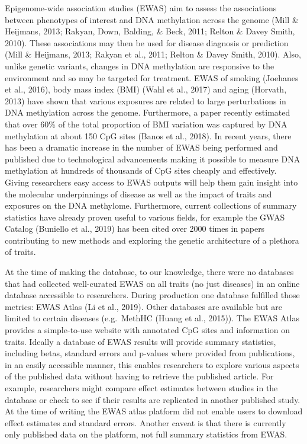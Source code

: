 \documentclass[11pt,twoside]{bristolthesis}
\begin{document}
Epigenome-wide association studies (EWAS) aim to assess the associations between phenotypes of interest and DNA methylation across the genome (Mill \& Heijmans, 2013; Rakyan, Down, Balding, \& Beck, 2011; Relton \& Davey Smith, 2010). These associations may then be used for disease diagnosis or prediction (Mill \& Heijmans, 2013; Rakyan et al., 2011; Relton \& Davey Smith, 2010). Also, unlike genetic variants, changes in DNA methylation are responsive to the environment and so may be targeted for treatment. EWAS of smoking (Joehanes et al., 2016), body mass index (BMI) (Wahl et al., 2017) and aging (Horvath, 2013) have shown that various exposures are related to large perturbations in DNA methylation across the genome. Furthermore, a paper recently estimated that over 60\% of the total proportion of BMI variation was captured by DNA methylation at about 150 CpG sites (Banos et al., 2018). In recent years, there has been a dramatic increase in the number of EWAS being performed and published due to technological advancements making it possible to measure DNA methylation at hundreds of thousands of CpG sites cheaply and effectively. Giving researchers easy access to EWAS outputs will help them gain insight into the molecular underpinnings of disease as well as the impact of traits and exposures on the DNA methylome. Furthermore, current collections of summary statistics have already proven useful to various fields, for example the GWAS Catalog (Buniello et al., 2019) has been cited over 2000 times in papers contributing to new methods and exploring the genetic architecture of a plethora of traits.

At the time of making the database, to our knowledge, there were no databases that had collected well-curated EWAS on all traits (no just diseases) in an online database accessible to researchers. During production one database fulfilled those metrics: EWAS Atlas (Li et al., 2019). Other databases are available but are limited to certain diseases (e.g.~MethHC (Huang et al., 2015)). The EWAS Atlas provides a simple-to-use website with annotated CpG sites and information on traits. Ideally a database of EWAS results will provide summary statistics, including betas, standard errors and p-values where provided from publications, in an easily accessible manner, this enables researchers to explore various aspects of the published data without having to retrieve the published article. For example, researchers might compare effect estimates between studies in the database or check to see if their results are replicated in another published study. At the time of writing the EWAS atlas platform did not enable users to download effect estimates and standard errors. Another caveat is that there is currently only published data on the platform, not full summary statistics from EWAS.
\end{document}
